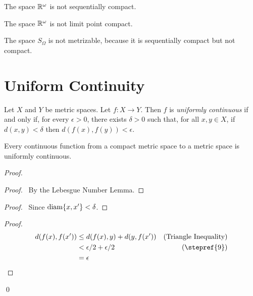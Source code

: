\begin{corollary}
    The space $\mathbb{R}^\omega$ is not sequentially compact.
\end{corollary}

\begin{corollary}
    The space $\mathbb{R}^\omega$ is not limit point compact.
\end{corollary}

\begin{example}
    The space $S_\Omega$ is not metrizable, because it is sequentially compact but not compact.
\end{example}

\section{Uniform Continuity}

\begin{definition}
    Let $X$ and $Y$ be metric spaces. Let $f : X \rightarrow Y$.
    Then $f$ is \emph{uniformly continuous} if and only if,
    for every $\epsilon > 0$, there exists $\delta > 0$ such that,
    for all $x, y \in X$, if $d(x,y) < \delta$ then
    $d(f(x),f(y)) < \epsilon$.
\end{definition}

\begin{theorem}
    Every continuous function from a compact metric space to a
    metric space is uniformly continuous.
\end{theorem}

\begin{proof}
    \pf
    \begin{proof}
        \pf\ By the Lebesgue Number Lemma.
    \end{proof}
    \begin{proof}
        \pf\ Since $\operatorname{diam} \{x, x'\} < \delta$.
    \end{proof}
    \begin{proof}
        \pf
        \begin{align*}
            d(f(x),f(x')) & \leq d(f(x),y) + d(y,f(x')) & (\text{Triangle Inequality}) \\
            & < \epsilon / 2 + \epsilon / 2 & (\text{\stepref{9}}) \\
            & = \epsilon
        \end{align*}
    \end{proof}
    \qed
\end{proof}

